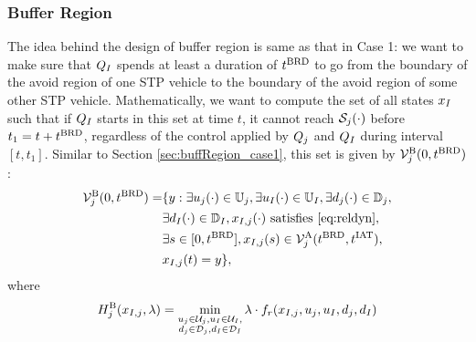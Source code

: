 \subsubsection{Buffer Region} \label{sec:buffRegion_case2}
The idea behind the design of buffer region is same as that in Case 1: we want to make sure that $Q_{I}$ spends at least a duration of $t^\text{BRD}$ to go from the boundary of the avoid region of one STP vehicle to the boundary of the avoid region of some other STP vehicle. Mathematically, we want to compute the set of all states $x_{I}$ such that if $Q_{I}$ starts in this set at time $t$, it cannot reach $\mathcal{S}_j(\cdot)$ before $t_1 = t + t^\text{BRD}$, regardless of the control applied by $Q_j$ and $Q_{I}$ during interval $[t, t_1]$. Similar to Section \ref{sec:buffRegion_case1}, this set is given by $\mathcal{V}^{\text{B}}_{j}(0, t^\text{BRD})$: 
\begin{equation} \label{eqn:buffBRS_case1}
\begin{aligned}
\brs^{\text{B}}_{j}(0, \brd) = & \{y: \exists \ctrl_j(\cdot) \in \cfset_j, \exists \ctrl_\intr(\cdot) \in \cfset_\intr, \exists \dstb_j(\cdot) \in \dfset_j, \\
& \exists \dstb_\intr(\cdot) \in \dfset_\intr, \state_{\intr, j}(\cdot) \text{ satisfies \eqref{eq:reldyn}},\\
& \exists s \in [0, \brd], \state_{\intr, j}(s) \in \brs^{\text{A}}_{j}(\brd, \iat),\\
& \state_{\intr, j}(t) = y\},
\end{aligned}
\end{equation}
where 
\begin{equation}
H^{\text{B}}_{j}(x_{I, j}, \lambda) = \min_{\substack{u_j \in \mathcal{U}_j, u_I \in \mathcal{U}_I, \\ d_j \in \mathcal{D}_j, d_I \in \mathcal{D}_I}} \lambda \cdot f_r(x_{I, j}, u_j, u_I, d_j, d_I)
\end{equation}

